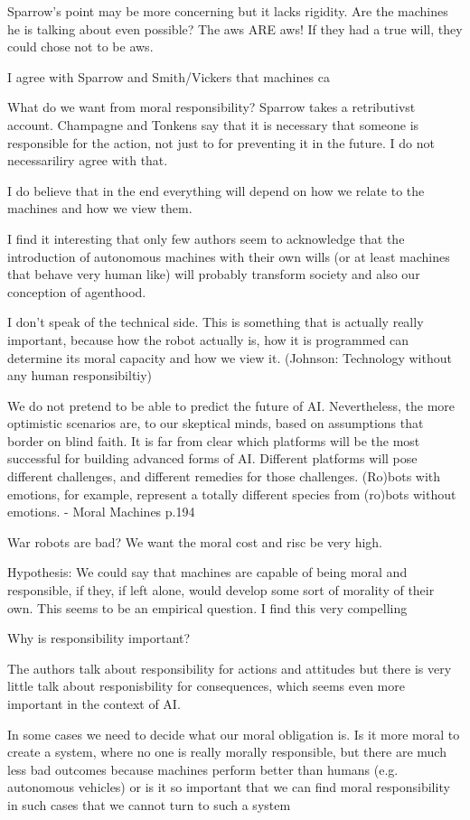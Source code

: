 \documentclass{article}
\newcounter{example}
\begin{document}
Sparrow's point may be more concerning but it lacks rigidity.
Are the machines he is talking about even possible?
The aws ARE aws! If they had a true will, they could chose not to be aws.


I agree with Sparrow and Smith/Vickers that machines ca


What do we want from moral responsibility? Sparrow takes a retributivst account.
Champagne and Tonkens say that it is necessary that someone is responsible for
the action, not just to for preventing it in the future. I do not necessariliry
agree with that.

I do believe that in the end everything will depend on how we relate to the
machines and how we view them.

I find it interesting that only few authors seem to acknowledge that the introduction
of autonomous machines with their own wills (or at least machines that behave
very human like) will probably transform society and also our conception of
agenthood.

I don't speak of the technical side. This is something that is actually really
important, because how the robot actually is, how it is programmed can determine
its moral capacity and how we view it. (Johnson: Technology without any human
responsibiltiy)


We do not pretend to be able to predict the future of AI. Nevertheless, the 
more optimistic scenarios are, to our skeptical minds, based on assumptions 
that border on blind faith. It is far from clear which platforms will be the most 
successful for building advanced forms of AI. Different platforms will pose 
different challenges, and different remedies for those challenges. (Ro)bots 
with emotions, for example, represent a totally different species from (ro)bots 
without emotions. - Moral Machines p.194

War robots are bad? We want the moral cost and risc be very high.

Hypothesis: We could say that machines are capable of being moral and
responsible, if they, if left alone, would develop some sort of morality of
their own. This seems to be an empirical question. I find this very compelling

Why is responsibility important?

The authors talk about responsibility for actions and attitudes but there is
very little talk about responisbility for consequences, which seems even more
important in the context of AI.

In some cases we need to decide what our moral obligation is. Is it more moral
to create a system, where no one is really morally responsible, but there are
much less bad outcomes because machines perform better than humans (e.g.
autonomous vehicles) or is it so important that we can find moral responsibility
in such cases that we cannot turn to such a system
\end{document}

